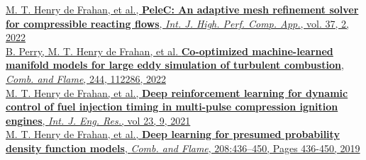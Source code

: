 \documentclass[11pt,letterpaper]{article}
\newcommand{\raisedrule}[2][0em]{\leaders\hbox{\rule[#1]{1pt}{#2}}\hfill}
\newcommand*{\sectionfont}{\Large\sffamily\mdseries\upshape}
\begin{document}
\href{https://doi.org/10.1177/10943420221121151}{M. T. Henry de Frahan, et al., \textbf{PeleC: An adaptive mesh refinement solver for compressible reacting flows}, \textit{Int. J. High. Perf. Comp. App.}, vol. 37, 2, 2022}\\[1ex]
\href{https://doi.org/10.1016/j.combustflame.2022.112286}{B. Perry, M. T. Henry de Frahan, et al. \textbf{Co-optimized machine-learned manifold models for large eddy simulation of turbulent combustion}, \textit{Comb. and Flame}, 244, 112286, 2022}\\[1ex]
\href{https://doi.org/10.1177/14680874211019345}{M. T. Henry de Frahan, et al., \textbf{Deep reinforcement learning for dynamic control of fuel injection timing in multi-pulse compression ignition engines}, \textit{Int. J. Eng. Res.}, vol 23, 9, 2021}\\[1ex]
\href{https://doi.org/10.1016/j.combustflame.2019.07.015}{M. T. Henry de Frahan, et al., \textbf{Deep learning for presumed probability density function models}, \textit{Comb. and Flame}, 208:436--450, Pages 436-450, 2019}\\[1ex]%
%
%
%
%
\end{document}

